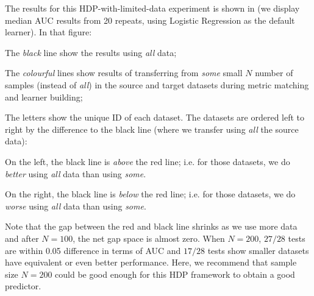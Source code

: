 The results for this HDP-with-limited-data experiment is shown in 
(we display median AUC results from 20 repeats, using  Logistic Regression
as the default learner). 
In that figure:
\squishlist
\item
  The {\em black} line show the results using {\em all} data;
\item
  The {\em colourful} lines show results of transferring from {\em some} small $N$ number of samples (instead of {\em all})
  in the source and target datasets during metric matching and learner building;
\item
  The letters show the unique ID of each dataset.
\squishend
The datasets are ordered left to right by the difference to the black line (where we transfer using {\em
  all} the source data):
\squishlist
\item
  On the left, the black line is
  {\em above} the red line; i.e. for those datasets, we do {\em better} using
  {\em all} data than using {\em some}.
  \item
On the right, the black line is {\em below} the red
line; i.e. for those datasets, we do {\em worse}
using {\em all} data than using {\em some}.
\squishend

Note that the gap between the red and black line
shrinks as we use more data and after $N=100$, the
net gap space is almost zero.  When $N=200$, $27/28$
tests are within 0.05 difference in terms of AUC and
$17/28$ tests show smaller datasets have equivalent
or even better performance. Here, we recommend that
sample size $N=200$ could be good enough for this
HDP framework to obtain a good predictor.




